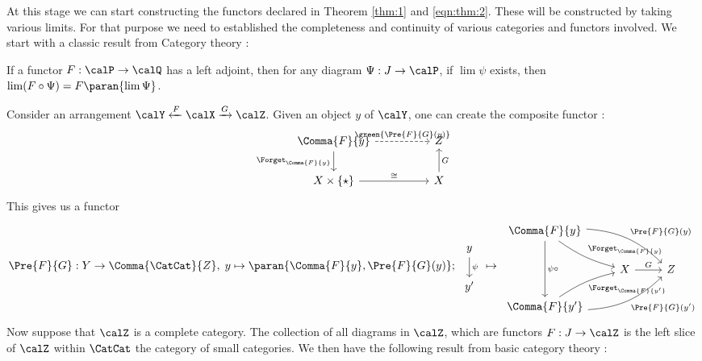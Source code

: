 \documentclass[12pt,oneside]{article}
\begin{document}
At this stage we can start constructing the functors declared in Theorem \ref{thm:1} and \eqref{eqn:thm:2}. These will be constructed by taking various limits. For that purpose we need to established the completeness and continuity of various categories and functors involved. We start with a classic result from Category theory :

\begin{lemma}  \label{lem:RAPL}
	\citep[][Thm 4.5.3]{Riehl_context_2017} If a functor $F:\calP\to \calQ$ has a left adjoint, then for any diagram $\Psi : J\to \calP$, if $\lim \psi$ exists, then $\lim (F\circ \Psi) = F \paran{ \lim \Psi }$. 
\end{lemma}

Consider an arrangement $\calY \xleftarrow{F} \calX \xrightarrow{G} \calZ$. Given an object $y$ of $\calY$, one can create the composite functor :
%
\begin{equation} \label{eqn:def:preFG}
	\begin{tikzcd}
		\Comma{F}{y} \arrow[dashed]{rr}{ \green{ \Pre{F}{G}(y) } } \arrow{d}[swap]{ \Forget_{ \Comma{F}{y} } } && Z \\
		X \times \{\star\} \arrow{rr}{\cong} && X \arrow{u}[swap]{ G }
	\end{tikzcd}
\end{equation}
%
This gives us a functor
%
\begin{equation} \label{eqn:def:Pre}
	\Pre{F}{G} : Y \to \Comma{ \CatCat }{Z}, \; y\mapsto \paran{ \Comma{F}{y}, \Pre{F}{G}(y) } ;\;  
	\begin{tikzcd} y \arrow{d}{\psi} \\ y' \end{tikzcd} \,\mapsto\, 
	\begin{tikzcd}
		\Comma{F}{y} \arrow[bend left=20]{drr}{ \Pre{F}{G}(y) } \arrow[bend right=10]{dr}{ \Forget_{ \Comma{F}{y} } } \arrow{dd}{\psi\circ}\\
		& X \arrow{r}{G} & Z\\
		\Comma{F}{y'} \arrow[bend left=10]{ur}[swap]{ \Forget_{ \Comma{F}{y'} } } \arrow[bend right=20]{urr}[swap]{ \Pre{F}{G}(y') }
	\end{tikzcd}
\end{equation}
%
Now suppose that $\calZ$ is a complete category. The collection of all diagrams in $\calZ$, which are functors $F:J\to \calZ$ is the left slice of $\calZ$ within $\CatCat$ the category of small categories. We then have the following result from basic category theory :
\end{document}
